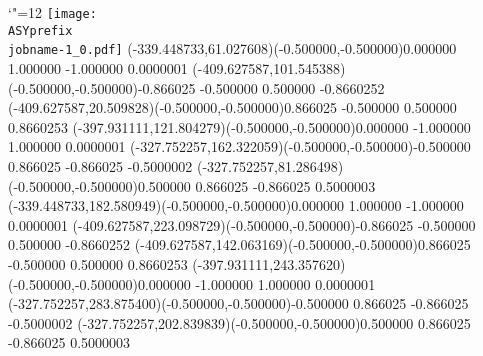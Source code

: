 \setlength{\unitlength}{1pt}
\makeatletter%
\let\ASYencoding\f@encoding%
\let\ASYfamily\f@family%
\let\ASYseries\f@series%
\let\ASYshape\f@shape%
\makeatother%
{\catcode`"=12%
\texttt{[image: \\ASYprefix\\jobname-1\_0.pdf]}%
}%
\color{ASYcolor}
\fontsize{12.000000}{14.400000}\selectfont
\usefont{\ASYencoding}{\ASYfamily}{\ASYseries}{\ASYshape}%
\ASYalignT(-339.448733,61.027608)(-0.500000,-0.500000){0.000000 1.000000 -1.000000 0.000000}{1}%
\color{ASYcolor}
\fontsize{12.000000}{14.400000}\selectfont
\ASYalignT(-409.627587,101.545388)(-0.500000,-0.500000){-0.866025 -0.500000 0.500000 -0.866025}{2}%
\color{ASYcolor}
\fontsize{12.000000}{14.400000}\selectfont
\ASYalignT(-409.627587,20.509828)(-0.500000,-0.500000){0.866025 -0.500000 0.500000 0.866025}{3}%
\color{ASYcolor}
\fontsize{12.000000}{14.400000}\selectfont
\ASYalignT(-397.931111,121.804279)(-0.500000,-0.500000){0.000000 -1.000000 1.000000 0.000000}{1}%
\color{ASYcolor}
\fontsize{12.000000}{14.400000}\selectfont
\ASYalignT(-327.752257,162.322059)(-0.500000,-0.500000){-0.500000 0.866025 -0.866025 -0.500000}{2}%
\color{ASYcolor}
\fontsize{12.000000}{14.400000}\selectfont
\ASYalignT(-327.752257,81.286498)(-0.500000,-0.500000){0.500000 0.866025 -0.866025 0.500000}{3}%
\color{ASYcolor}
\fontsize{12.000000}{14.400000}\selectfont
\ASYalignT(-339.448733,182.580949)(-0.500000,-0.500000){0.000000 1.000000 -1.000000 0.000000}{1}%
\color{ASYcolor}
\fontsize{12.000000}{14.400000}\selectfont
\ASYalignT(-409.627587,223.098729)(-0.500000,-0.500000){-0.866025 -0.500000 0.500000 -0.866025}{2}%
\color{ASYcolor}
\fontsize{12.000000}{14.400000}\selectfont
\ASYalignT(-409.627587,142.063169)(-0.500000,-0.500000){0.866025 -0.500000 0.500000 0.866025}{3}%
\color{ASYcolor}
\fontsize{12.000000}{14.400000}\selectfont
\ASYalignT(-397.931111,243.357620)(-0.500000,-0.500000){0.000000 -1.000000 1.000000 0.000000}{1}%
\color{ASYcolor}
\fontsize{12.000000}{14.400000}\selectfont
\ASYalignT(-327.752257,283.875400)(-0.500000,-0.500000){-0.500000 0.866025 -0.866025 -0.500000}{2}%
\color{ASYcolor}
\fontsize{12.000000}{14.400000}\selectfont
\ASYalignT(-327.752257,202.839839)(-0.500000,-0.500000){0.500000 0.866025 -0.866025 0.500000}{3}%

